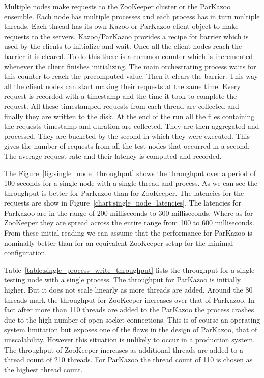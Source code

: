 Multiple nodes make requests to the ZooKeeper cluster or the ParKazoo ensemble. Each node has multiple processes and each process has in turn multiple threads. Each thread has its own Kazoo or ParKazoo client object to make requests to the servers. Kazoo/ParKazoo provides a recipe for barrier which is used by the clients to initialize and wait. Once all the client nodes reach the barrier it is cleared. To do this there is a common counter which is incremented whenever the client finishes initializing. The main orchestrating process waits for this counter to reach the precomputed value. Then it clears the barrier. This way all the client nodes can start making their requests at the same time. Every request is recorded with a timestamp and the time it took to complete the request. All these timestamped requests from each thread are collected and finally they are written to the disk. At the end of the run all the files containing the requests timestamp and duration are collected. They are then aggregated and processed. They are bucketed by the second in which they were executed. This gives the number of requests from all the test nodes that occurred in a second. The average request rate and their latency is computed and recorded. 





The Figure~\ref{fig:single_node_throughput} shows the throughput over a period of 100 seconds for a single node with a single thread and process. As we can see the throughput is better for ParKazoo than for ZooKeeper. The latencies for the requests are show in Figure~\ref{chart:single_node_latencies}. The latencies for ParKazoo are in the range of 200 milliseconds to 300 milliseconds. Where as for ZooKeeper they are spread across the entire range from 100 to 600 milliseconds. From these initial reading we can assume that the performance for ParKazoo is nominally better than for an equivalent ZooKeeper setup for the minimal configuration.



Table~\ref{table:single_process_write_throughput} lists the throughput for a single testing node with a single process. The throughput for ParKazoo is initially higher. But it does not scale linearly as more threads are added. Around the 80 threads mark the throughput for ZooKeeper increases over that of ParKazoo. In fact after more than 110 threads are added to the ParKazoo the process crashes due to the high number of open socket connections. This is of course an operating system limitation but exposes one of the flaws in the design of ParKazoo, that of unscalability. However this situation is unlikely to occur in a production system. The throughput of ZooKeeper increases as additional threads are added to a thread count of 210 threads. For ParKazoo the thread count of 110 is chosen as the highest thread count.

